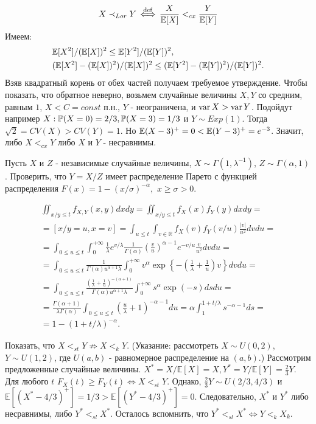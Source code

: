 $$X \prec_{Lor} Y \iffdef \frac{X}{\E[X]} <_{cx} \frac{Y}{\E[Y]}$$
Имеем: 
\begin{align}
    & \E [X^2] / (\E [X])^2 \leq \E[Y^2 ]/ (\E[Y])^2, \\
    & (\E[X^2] - (\E[X])^2)/ (\E[X])^2 \leq (\E[Y^2] - (\E[Y])^2) / (\E[Y])^2.
\end{align}
Взяв квадратный корень от обех частей получаем требуемое утверждение.
Чтобы показать, что обратное неверно, возьмем случайные величины $X,Y$ со средним, равным $1$, $X<C=const$ п.н., $Y$ - неограничена, и $\var X > \var Y $. Подойдут например $X: \P(X=0) = 2/3, \P (X = 3) = 1/3$ и $Y \sim Exp(1).$ Тогда $\sqrt 2 = CV(X) > CV(Y) = 1 $. Но $\E(X - 3)^+ = 0 < \E(Y - 3)^+ = e^{-3}$. Значит, либо $X<_{cx} Y$ либо $X$ и $Y$ - несравнимы. 

\problem{}
Пусть $X$ и $Z$ - независимые случайные величины, $X \sim \Gamma(1, \lambda^{-1})$, $Z \sim \Gamma(\alpha, 1)$. Проверить, что $Y = X/Z$ имеет распределение Парето с функцией распределения $F(x) = 1 - (x/\sigma)^{-\alpha},$ $x \geq \sigma > 0$.
\solution{}

\begin{multline*}
    \iint_{x/y \leq t} f_{X,Y}(x,y)dxdy = \iint_{x/y \leq t} f_{X}(x) f_Y(y)dxdy =\\= \left[x/y = u, x = v \right] =
    \int_{u\leq t}\int_{v \in \mathbb R}f_X(v)f_Y(v/u)\frac{|v|}{u^2}dvdu =\\= 
    \int_{0\leq u\leq t}\int_0^{+\infty} \frac{1}{\lambda}e^{v/\lambda} \frac{1}{\Gamma(\alpha)}\left( \frac{v}{u}\right)^{\alpha - 1} e^{-v/u} \frac{v}{u^2} dv du =\\= 
    \int_{0\leq u\leq t}\frac{1}{\Gamma(\alpha) u^{\alpha +1} \lambda}\int_0^{+\infty} v^\alpha \exp\left\{-\left(\frac1\lambda + \frac1u\right)v\right\} dv du =\\= 
    \int_{0\leq u\leq t}\frac{(\frac1\lambda + \frac1u)^{-(\alpha +1)}}{\Gamma(\alpha) u^{\alpha +1} \lambda}\int_0^{+\infty} s^\alpha \exp\left(-s\right) ds du =\\= \frac{\Gamma(\alpha + 1)}{\lambda\Gamma(\alpha)} \int_{0\leq u\leq t} \left(\frac u\lambda + 1 \right)^{-\alpha - 1}du = \alpha \int_1^{1+ t/\lambda} s^{-\alpha - 1}ds = \\ = 1 - (1 + t/\lambda)^{-\alpha}.
\end{multline*}

\problem{}
Показать, что $ X <_{st} Y \not\Rightarrow X <_k Y $. (Указание: рассмотреть $X \sim U(0, 2)$, $Y \sim U(1, 2)$, где $U(a, b)$ - равномерное
распределение на $(a, b)$.)
\solution{}
Рассмотрим предложенные случайные величины. $X^* = X/\mathbb E[X] = X, Y^* = Y/\mathbb E [Y] = \frac{2}{3}Y$. Для любого $t$ $F_X(t)\geq F_Y(t) \iff X<_{st} Y$. Однако, $\frac{2}{3}Y \sim U(2/3, 4/3)$ и $\mathbb E[(X^* - 4/3)^+] = 1/3 > \mathbb E [(Y^* - 4/3)^+] = 0$. Следовательно, $X^*$ и $Y^*$ либо несравнимы, либо $Y^* <_{sl} X^*$. Осталось вспомнить, что $Y^* <_{sl} X^* \Leftrightarrow Y <_{k} X_{k}$.

